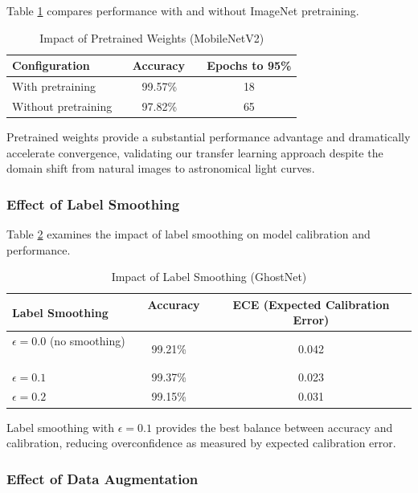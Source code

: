 \documentclass[11pt,a4paper]{article}
\begin{document}
Table \ref{tab:ablation_pretrain} compares performance with and without ImageNet pretraining.

\begin{table}[htbp]
\centering
\caption{Impact of Pretrained Weights (MobileNetV2)}
\label{tab:ablation_pretrain}
\begin{tabular}{lcc}
\toprule
\textbf{Configuration} \ &  \textbf{Accuracy} \ &  \textbf{Epochs to 95\%} \\
\midrule
With pretraining \ &  99.57\% \ &  18 \\
Without pretraining \ &  97.82\% \ &  65 \\
\bottomrule
\end{tabular}
\end{table}

Pretrained weights provide a substantial performance advantage and dramatically accelerate convergence, validating our transfer learning approach despite the domain shift from natural images to astronomical light curves.

\subsubsection{Effect of Label Smoothing}

Table \ref{tab:ablation_smoothing} examines the impact of label smoothing on model calibration and performance.

\begin{table}[htbp]
\centering
\caption{Impact of Label Smoothing (GhostNet)}
\label{tab:ablation_smoothing}
\begin{tabular}{lcc}
\toprule
\textbf{Label Smoothing} \ &  \textbf{Accuracy} \ &  \textbf{ECE (Expected Calibration Error)} \\
\midrule
$\epsilon = 0.0$ (no smoothing) \ &  99.21\% \ &  0.042 \\
$\epsilon = 0.1$ \ &  99.37\% \ &  0.023 \\
$\epsilon = 0.2$ \ &  99.15\% \ &  0.031 \\
\bottomrule
\end{tabular}
\end{table}

Label smoothing with $\epsilon = 0.1$ provides the best balance between accuracy and calibration, reducing overconfidence as measured by expected calibration error.

\subsubsection{Effect of Data Augmentation}
\end{document}
